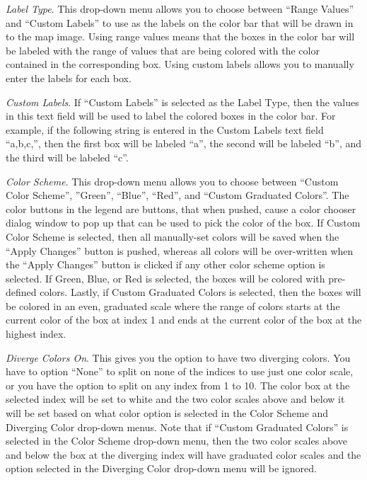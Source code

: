 \emph{Label Type}. 
This drop-down menu allows 
you to choose between ``Range Values'' and 
``Custom Labels'' to use as the labels on the color bar that will 
be drawn in to the map image. Using range values means that the 
boxes in the color bar will be labeled with the range of values that 
are being colored with the color contained in the corresponding box. 
Using custom labels allows you to manually enter the labels 
for each box.

\emph{Custom Labels}. 
If ``Custom Labels'' is 
selected as the Label Type, then the values 
in this text field will be used to label the colored boxes in the 
color bar. For example, if the following string is entered in 
the Custom Labels text field ``a,b,c,'', then the first box will 
be labeled ``a'', the second will be labeled ``b'', and the third 
will be labeled ``c''.

\emph{Color Scheme}. 
This drop-down menu allows you to choose between ``Custom Color Scheme'', 
''Green'', ``Blue'', ``Red'', and ``Custom Graduated Colors''. The color 
buttons in the legend are buttons, that when pushed, cause a color 
chooser dialog window to pop up that can be used to pick the color of 
the box. If Custom Color Scheme is selected, then all manually-set colors 
will be saved when the ``Apply Changes'' button is pushed, whereas all colors 
will be over-written when the ``Apply Changes'' button is clicked if any other 
color scheme option is selected. If Green, Blue, or Red is selected, the 
boxes will be colored with pre-defined colors. Lastly, if Custom Graduated 
Colors is selected, then the boxes will be colored in an even, graduated 
scale where the range of colors starts at the current color of the box at 
index 1 and ends at the current color of the box at the highest index.

\emph{Diverge Colors On}. 
This gives you the option to 
have two diverging colors. You have to option 
``None'' to split on none of the indices to use just one color scale, or 
you have the option to split on any index from 1 to 10. The color box at the 
selected index will be set to white and the two color scales above and 
below it will be set based on what color option is selected in the Color 
Scheme and Diverging Color drop-down menus. Note that if ``Custom Graduated Colors'' 
is selected in the Color Scheme drop-down menu, then the two color 
scales above and below the box at the diverging index will have graduated 
color scales and the option selected in the Diverging Color drop-down menu 
will be ignored.


